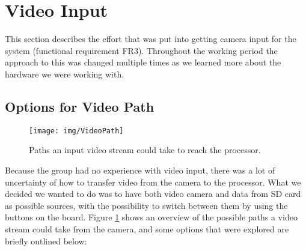 \section{Video Input}
This section describes the effort that was put into getting camera input for the system (functional requirement FR3).
Throughout the working period the approach to this was changed multiple times as we learned more about the hardware we were working with.




\subsection{Options for Video Path}
\begin{figure}
    \centering
    \texttt{[image: img/VideoPath]}
    \caption{Paths an input video stream could take to reach the processor.}
    \label{fig:VideoPath}
\end{figure}

Because the group had no experience with video input,
there was a lot of uncertainty of how to transfer video from the camera to the processor.
What we decided we wanted to do was to have both video camera and data from SD card as possible sources,
with the possibility to switch between them by using the buttons on the board.
Figure \ref{fig:VideoPath} shows an overview of the possible paths a video stream could take from the camera,
and some options that were explored are briefly outlined below:

